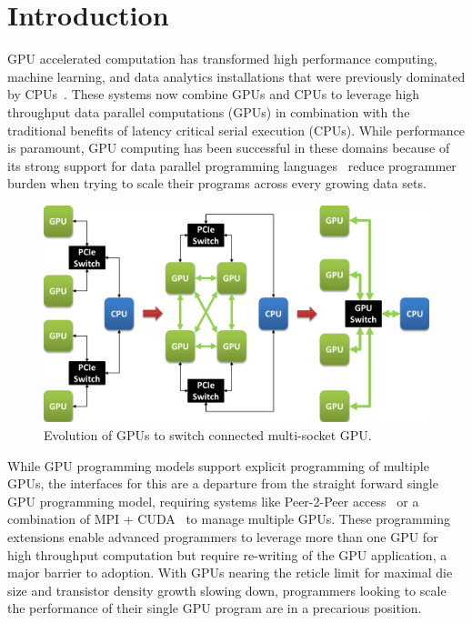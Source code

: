 \section{Introduction}
\label{introduction}
GPU accelerated computation has transformed high performance computing,
machine learning, and data analytics installations that were previously
dominated by CPUs~\cite{pascal,intersect360,cudnn,Lavin15b,SimonyanZ14a}.
These systems now combine GPUs and CPUs to leverage high throughput data parallel
computations (GPUs) in combination with the traditional benefits of latency critical
serial execution (CPUs).  While performance is paramount, GPU computing has been 
successful in these domains because of its strong support for 
data parallel programming languages~\cite{CUDA7,OPENCL} reduce programmer burden
when trying to scale their programs across every growing data sets.

\begin{figure}[t]
\centering
\includegraphics[width=1.0\columnwidth]{figures/inter_gpu_connections.pdf}
\caption{Evolution of GPUs to switch connected multi-socket GPU.}
\label{fig:systemdiagram}
\vspace{-.15in}
\end{figure}

While GPU programming models support explicit programming of multiple GPUs, the 
interfaces for this are a departure from the straight forward single GPU 
programming model, requiring systems like Peer-2-Peer access~\cite{NVIDIAP2P} 
or a combination of MPI + CUDA~\cite{NVIDIAMPI} to manage multiple GPUs.  These 
programming extensions enable advanced programmers to leverage more than one 
GPU for high throughput computation but require re-writing of the GPU 
application, a major barrier to adoption.  With GPUs nearing the reticle limit 
for maximal die size and transistor density growth slowing down, programmers 
looking to scale the performance of their single GPU program are in a precarious 
position.

